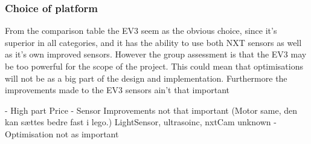 \subsubsection{Choice of platform}
From the comparison table the EV3 seem as the obvious choice, since it's superior in all categories, and it has the ability to use both NXT sensors as well as it's own improved sensors. However the group assessment is that the EV3 may be too powerful for the scope of the project. This could mean that optimisations will not be as a big part of the design and implementation. Furthermore the improvements made to the EV3 sensors ain't that important


- High part Price
- Sensor Improvements not that important (Motor same, den kan sættes bedre fast i lego.) LightSensor, ultrasoinc, nxtCam unknown
- Optimisation not as important




